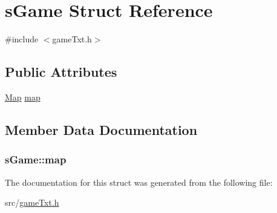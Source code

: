 \hypertarget{structs_game}{\section{s\-Game Struct Reference}
\label{structs_game}
}


{\ttfamily \#include $<$game\-Txt.\-h$>$}

\subsection*{Public Attributes}
\begin{DoxyCompactItemize}
\item 
\hyperlink{map_8h_af9824e0a3cac785d07b43c5265fddd5a}{Map} \hyperlink{structs_game_a530f96ca01d933573496424da40b99bb}{map}
\end{DoxyCompactItemize}


\subsection{Member Data Documentation}
\hypertarget{structs_game_a530f96ca01d933573496424da40b99bb}{
\subsubsection[{map}]{ s\-Game\-::map}}\label{structs_game_a530f96ca01d933573496424da40b99bb}


The documentation for this struct was generated from the following file\-:\begin{DoxyCompactItemize}
\item 
src/\hyperlink{game_txt_8h}{game\-Txt.\-h}\end{DoxyCompactItemize}
